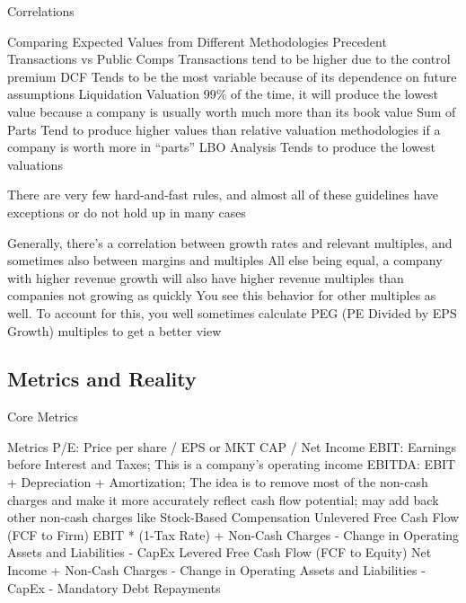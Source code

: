 \documentclass[10pt]{article}
\begin{document}
    \begin{core}{Correlations}

      Comparing Expected Values from Different Methodologies
      Precedent Transactions vs Public Comps
        Transactions tend to be higher due to the control premium
      DCF
        Tends to be the most variable because of its dependence on future assumptions
      Liquidation Valuation
        99\% of the time, it will produce the lowest value because a company is usually worth much more than its book value
      Sum of Parts
        Tend to produce higher values than relative valuation methodologies if a company is worth more in “parts”
      LBO Analysis
        Tends to produce the lowest valuations

      There are very few hard-and-fast rules, and almost all of these guidelines have exceptions or do not hold up in many cases

      Generally, there’s a correlation between growth rates and relevant multiples, and sometimes also between margins and multiples
      All else being equal, a company with higher revenue growth will also have higher revenue multiples than companies not growing as quickly
      You see this behavior for other multiples as well. To account for this, you well sometimes calculate PEG (PE Divided by EPS Growth) multiples to get a better view

    \end{core}
 
  \subsection{Metrics and Reality}

    \begin{core}{Core Metrics}

      Metrics
        P/E: Price per share / EPS or MKT CAP / Net Income
        EBIT: Earnings before Interest and Taxes; This is a company’s operating income
        EBITDA: EBIT + Depreciation + Amortization; The idea is to remove most of the non-cash charges and make it more accurately reflect cash flow potential; may add back other non-cash charges like Stock-Based Compensation
        Unlevered Free Cash Flow (FCF to Firm)
        EBIT * (1-Tax Rate) + Non-Cash Charges - Change in Operating Assets and Liabilities - CapEx
        Levered Free Cash Flow (FCF to Equity)
        Net Income + Non-Cash Charges - Change in Operating Assets and Liabilities - CapEx - Mandatory Debt Repayments

    \end{core}
\end{document}
